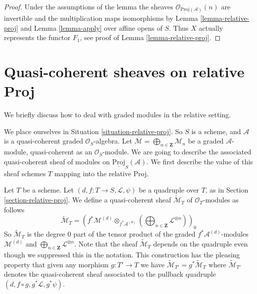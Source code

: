 \begin{proof}
Under the assumptions of the lemma the sheaves
$\mathcal{O}_{\underline{\text{Proj}}(\mathcal{A})}(n)$
are invertible and the multiplication maps isomorphisms
by Lemma \ref{lemma-relative-proj} and
Lemma \ref{lemma-apply}
over affine opens of $S$. Thus $X$ actually represents the
functor $F_1$, see proof of Lemma \ref{lemma-relative-proj}.
\end{proof}












\section{Quasi-coherent sheaves on relative Proj}
\label{section-quasi-coherent-relative-proj}

\noindent
We briefly discuss how to deal with graded modules in the relative
setting.

\medskip\noindent
We place ourselves in Situation \ref{situation-relative-proj}.
So $S$ is a scheme, and
$\mathcal{A}$ is a quasi-coherent graded $\mathcal{O}_S$-algebra.
Let $\mathcal{M} = \bigoplus_{n \in \mathbf{Z}} \mathcal{M}_n$
be a graded $\mathcal{A}$-module, quasi-coherent as an $\mathcal{O}_S$-module.
We are going to describe the associated quasi-coherent sheaf
of modules on $\underline{\text{Proj}}_S(\mathcal{A})$.
We first describe the value of this sheaf schemes $T$ mapping
into the relative Proj.

\medskip\noindent
Let $T$ be a scheme. Let $(d, f : T \to S, \mathcal{L}, \psi)$
be a quadruple over $T$, as in Section \ref{section-relative-proj}.
We define a quasi-coherent sheaf
$\widetilde{\mathcal{M}}_T$ of $\mathcal{O}_T$-modules
as follows
\begin{equation}
\label{equation-widetilde-M}
\widetilde{\mathcal{M}}_T =
\left(
f^*\mathcal{M}^{(d)}
\otimes_{f^*\mathcal{A}^{(d)}}
\left(\bigoplus\nolimits_{n \in \mathbf{Z}} \mathcal{L}^{\otimes n}\right)
\right)_0
\end{equation}
So $\widetilde{\mathcal{M}}_T$ is the degree $0$ part
of the tensor product of the graded $f^*\mathcal{A}^{(d)}$-modules
$\mathcal{M}^{(d)}$ and
$\bigoplus\nolimits_{n \in \mathbf{Z}} \mathcal{L}^{\otimes n}$.
Note that the sheaf $\widetilde{\mathcal{M}}_T$ depends on the quadruple
even though we suppressed this in the notation.
This construction has the pleasing property that
given any morphism $g : T' \to T$ we have
$\widetilde{\mathcal{M}}_{T'} = g^*\widetilde{\mathcal{M}}_T$
where $\widetilde{\mathcal{M}}_{T'}$ denotes the quasi-coherent
sheaf associated to the pullback quadruple
$(d, f \circ g, g^*\mathcal{L}, g^*\psi)$.

